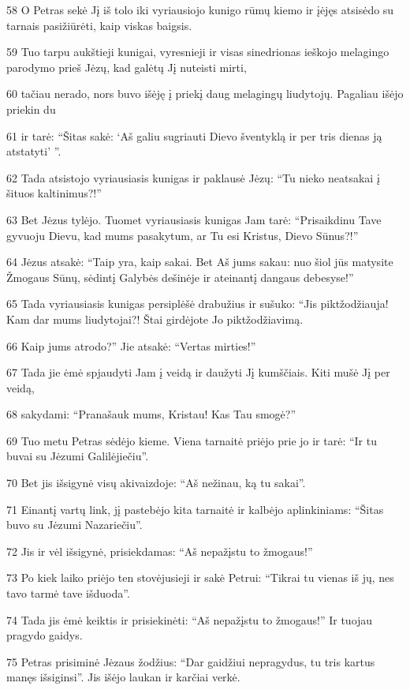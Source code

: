 \par 58 O Petras sekė Jį iš tolo iki vyriausiojo kunigo rūmų kiemo ir įėjęs atsisėdo su tarnais pasižiūrėti, kaip viskas baigsis. 
\par 59 Tuo tarpu aukštieji kunigai, vyresnieji ir visas sinedrionas ieškojo melagingo parodymo prieš Jėzų, kad galėtų Jį nuteisti mirti, 
\par 60 tačiau nerado, nors buvo išėję į priekį daug melagingų liudytojų. Pagaliau išėjo priekin du 
\par 61 ir tarė: “Šitas sakė: ‘Aš galiu sugriauti Dievo šventyklą ir per tris dienas ją atstatyti’ ”. 
\par 62 Tada atsistojo vyriausiasis kunigas ir paklausė Jėzų: “Tu nieko neatsakai į šituos kaltinimus?!” 
\par 63 Bet Jėzus tylėjo. Tuomet vyriausiasis kunigas Jam tarė: “Prisaikdinu Tave gyvuoju Dievu, kad mums pasakytum, ar Tu esi Kristus, Dievo Sūnus?!” 
\par 64 Jėzus atsakė: “Taip yra, kaip sakai. Bet Aš jums sakau: nuo šiol jūs matysite Žmogaus Sūnų, sėdintį Galybės dešinėje ir ateinantį dangaus debesyse!” 
\par 65 Tada vyriausiasis kunigas persiplėšė drabužius ir sušuko: “Jis piktžodžiauja! Kam dar mums liudytojai?! Štai girdėjote Jo piktžodžiavimą. 
\par 66 Kaip jums atrodo?” Jie atsakė: “Vertas mirties!” 
\par 67 Tada jie ėmė spjaudyti Jam į veidą ir daužyti Jį kumščiais. Kiti mušė Jį per veidą, 
\par 68 sakydami: “Pranašauk mums, Kristau! Kas Tau smogė?” 
\par 69 Tuo metu Petras sėdėjo kieme. Viena tarnaitė priėjo prie jo ir tarė: “Ir tu buvai su Jėzumi Galilėjiečiu”. 
\par 70 Bet jis išsigynė visų akivaizdoje: “Aš nežinau, ką tu sakai”. 
\par 71 Einantį vartų link, jį pastebėjo kita tarnaitė ir kalbėjo aplinkiniams: “Šitas buvo su Jėzumi Nazariečiu”. 
\par 72 Jis ir vėl išsigynė, prisiekdamas: “Aš nepažįstu to žmogaus!” 
\par 73 Po kiek laiko priėjo ten stovėjusieji ir sakė Petrui: “Tikrai tu vienas iš jų, nes tavo tarmė tave išduoda”. 
\par 74 Tada jis ėmė keiktis ir prisiekinėti: “Aš nepažįstu to žmogaus!” Ir tuojau pragydo gaidys. 
\par 75 Petras prisiminė Jėzaus žodžius: “Dar gaidžiui nepragydus, tu tris kartus manęs išsiginsi”. Jis išėjo laukan ir karčiai verkė.



